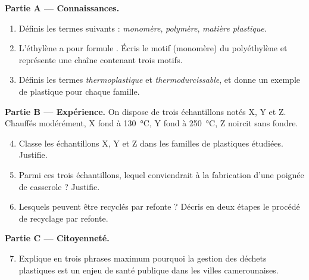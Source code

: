 \documentclass[11pt]{article}
\begin{document}
\begin{exercice}
\textbf{Partie A — Connaissances.}
\begin{enumerate}
\item Définis les termes suivants : \emph{monomère}, \emph{polymère}, \emph{matière plastique}.
\item L'éthylène a pour formule . Écris le motif (monomère) du polyéthylène et représente une chaîne contenant trois motifs.
\item Définis les termes \emph{thermoplastique} et \emph{thermodurcissable}, et donne un exemple de plastique pour chaque famille.
\end{enumerate}
\textbf{Partie B — Expérience.} On dispose de trois échantillons notés X, Y et Z. Chauffés modérément, X fond à \SI{130}{\celsius}, Y fond à \SI{250}{\celsius}, Z noircit sans fondre.
\begin{enumerate}
\setcounter{enumi}{3}
\item Classe les échantillons X, Y et Z dans les familles de plastiques étudiées. Justifie.
\item Parmi ces trois échantillons, lequel conviendrait à la fabrication d'une poignée de casserole ? Justifie.
\item Lesquels peuvent être recyclés par refonte ? Décris en deux étapes le procédé de recyclage par refonte.
\end{enumerate}
\textbf{Partie C — Citoyenneté.}
\begin{enumerate}
\setcounter{enumi}{6}
\item Explique en trois phrases maximum pourquoi la gestion des déchets plastiques est un enjeu de santé publique dans les villes camerounaises.
\end{enumerate}
\end{exercice}
\end{document}
